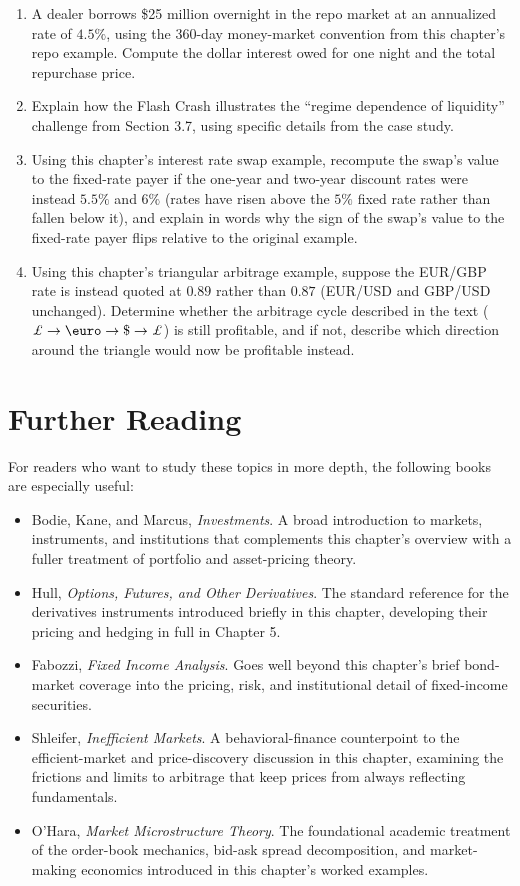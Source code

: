 \documentclass[../ai_in_finance]{subfiles}
\begin{document}
\begin{enumerate}
    \item A dealer borrows \$25 million overnight in the repo market at an annualized rate of $4.5\%$, using the 360-day money-market convention from this chapter's repo example. Compute the dollar interest owed for one night and the total repurchase price.
    \item Explain how the Flash Crash illustrates the ``regime dependence of liquidity'' challenge from Section 3.7, using specific details from the case study.
    \item Using this chapter's interest rate swap example, recompute the swap's value to the fixed-rate payer if the one-year and two-year discount rates were instead $5.5\%$ and $6\%$ (rates have risen above the $5\%$ fixed rate rather than fallen below it), and explain in words why the sign of the swap's value to the fixed-rate payer flips relative to the original example.
    \item Using this chapter's triangular arbitrage example, suppose the EUR/GBP rate is instead quoted at $0.89$ rather than $0.87$ (EUR/USD and GBP/USD unchanged). Determine whether the arbitrage cycle described in the text ($\pounds \to \text{\euro} \to \$ \to \pounds$) is still profitable, and if not, describe which direction around the triangle would now be profitable instead.
\end{enumerate}

\section{Further Reading}

For readers who want to study these topics in more depth, the following books are especially useful:

\begin{itemize}
    \item Bodie, Kane, and Marcus, \emph{Investments}. A broad introduction to markets, instruments, and institutions that complements this chapter's overview with a fuller treatment of portfolio and asset-pricing theory.
    \item Hull, \emph{Options, Futures, and Other Derivatives}. The standard reference for the derivatives instruments introduced briefly in this chapter, developing their pricing and hedging in full in Chapter 5.
    \item Fabozzi, \emph{Fixed Income Analysis}. Goes well beyond this chapter's brief bond-market coverage into the pricing, risk, and institutional detail of fixed-income securities.
    \item Shleifer, \emph{Inefficient Markets}. A behavioral-finance counterpoint to the efficient-market and price-discovery discussion in this chapter, examining the frictions and limits to arbitrage that keep prices from always reflecting fundamentals.
    \item O'Hara, \emph{Market Microstructure Theory}. The foundational academic treatment of the order-book mechanics, bid-ask spread decomposition, and market-making economics introduced in this chapter's worked examples.
\end{itemize}
\end{document}

